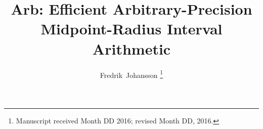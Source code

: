 \documentclass[10pt,journal,compsoc,cspaper]{IEEEtran}
\begin{document}
%
\title{Arb: Efficient Arbitrary-Precision \\ Midpoint-Radius Interval Arithmetic}
%
%
%
%

\author{Fredrik~Johansson
\thanks{Manuscript received Month DD 2016; revised Month DD, 2016.}}

% 
%
\end{document}
